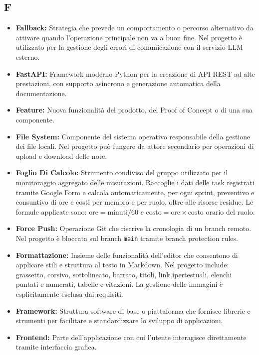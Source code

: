 {}
\subsection*{F}
\begin{itemize}[leftmargin=*]
      \item \textbf{Fallback:} Strategia che prevede un comportamento o percorso alternativo da attivare quando l'operazione principale non va a buon fine. Nel progetto è utilizzato per la gestione degli errori di comunicazione con il servizio LLM esterno.
      \item \textbf{FastAPI:} Framework moderno Python per la creazione di API REST ad alte prestazioni, con supporto asincrono e generazione automatica della documentazione.
      \item \textbf{Feature:} Nuova funzionalità del prodotto, del Proof of Concept o di
      una sua componente.
      \item \textbf{File System:} Componente del sistema operativo responsabile della gestione dei file locali. Nel progetto può fungere da attore secondario per operazioni di upload e download delle note.
      \item \textbf{Foglio Di Calcolo:} Strumento condiviso del gruppo utilizzato per
      il monitoraggio aggregato delle misurazioni. Raccoglie i dati delle task
      registrati tramite Google Form e calcola automaticamente, per ogni sprint,
      preventivo e consuntivo di ore e costi per membro e per ruolo, oltre alle
      risorse residue. Le formule applicate sono: $\text{ore} = \text{minuti} / 60$
      e $\text{costo} = \text{ore} \times \text{costo orario del ruolo}$.
      \item \textbf{Force Push:} Operazione Git che riscrive la cronologia di un branch remoto. Nel progetto è bloccata sul branch \texttt{main} tramite branch protection rules.
      \item \textbf{Formattazione:} Insieme delle funzionalità dell'editor che
            consentono di applicare stili e struttura al testo in Markdown.
            Nel progetto include: grassetto, corsivo, sottolineato, barrato,
            titoli, link ipertestuali, elenchi puntati e numerati, tabelle e
            citazioni. La gestione delle immagini è esplicitamente esclusa dai
            requisiti.
      \item \textbf{Framework:} Struttura software di base o piattaforma che fornisce librerie e strumenti per facilitare e standardizzare lo sviluppo di applicazioni.
      \item \textbf{Frontend:} Parte dell'applicazione con cui l'utente interagisce
      direttamente tramite interfaccia grafica.
\end{itemize}
 
